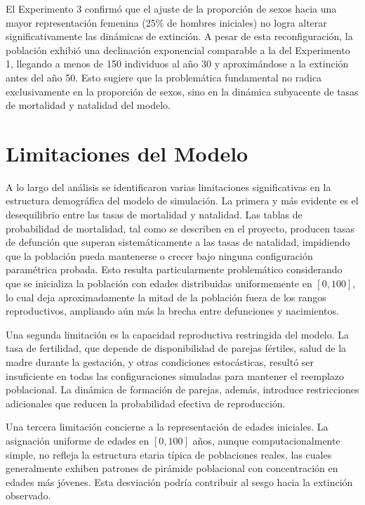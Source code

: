 \documentclass[12pt, a4paper, spanish]{report}
\begin{document}
El Experimento 3 confirmó que el ajuste de la proporción de sexos hacia una mayor representación femenina (25\% de hombres iniciales) no logra alterar significativamente las dinámicas de extinción. A pesar de esta reconfiguración, la población exhibió una declinación exponencial comparable a la del Experimento 1, llegando a menos de 150 individuos al año 30 y aproximándose a la extinción antes del año 50. Esto sugiere que la problemática fundamental no radica exclusivamente en la proporción de sexos, sino en la dinámica subyacente de tasas de mortalidad y natalidad del modelo.

\section{Limitaciones del Modelo}

A lo largo del análisis se identificaron varias limitaciones significativas en la estructura demográfica del modelo de simulación. La primera y más evidente es el desequilibrio entre las tasas de mortalidad y natalidad. Las tablas de probabilidad de mortalidad, tal como se describen en el proyecto, producen tasas de defunción que superan sistemáticamente a las tasas de natalidad, impidiendo que la población pueda mantenerse o crecer bajo ninguna configuración paramétrica probada. Esto resulta particularmente problemático considerando que se inicializa la población con edades distribuidas uniformemente en $[0, 100]$, lo cual deja aproximadamente la mitad de la población fuera de los rangos reproductivos, ampliando aún más la brecha entre defunciones y nacimientos.

Una segunda limitación es la capacidad reproductiva restringida del modelo. La tasa de fertilidad, que depende de disponibilidad de parejas fértiles, salud de la madre durante la gestación, y otras condiciones estocásticas, resultó ser insuficiente en todas las configuraciones simuladas para mantener el reemplazo poblacional. La dinámica de formación de parejas, además, introduce restricciones adicionales que reducen la probabilidad efectiva de reproducción.

Una tercera limitación concierne a la representación de edades iniciales. La asignación uniforme de edades en $[0, 100]$ años, aunque computacionalmente simple, no refleja la estructura etaria típica de poblaciones reales, las cuales generalmente exhiben patrones de pirámide poblacional con concentración en edades más jóvenes. Esta desviación podría contribuir al sesgo hacia la extinción observado.
\end{document}
